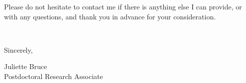 \documentclass[11pt]{article}
\begin{document}
Please do not hesitate to contact me if there is anything else I can provide, or with any questions, and thank you in advance for your consideration. 

\vspace{24pt}
\noindent
\begin{minipage}{0.99\textwidth}
\begin{minipage}{0.69\textwidth}
\textcolor{white}{.}
\end{minipage}
\begin{minipage}{0.29\textwidth}
Sincerely, 

\vspace{36pt}
Juliette Bruce\\
Postdoctoral Research Associate\end{minipage}
\end{minipage}

\end{document}
